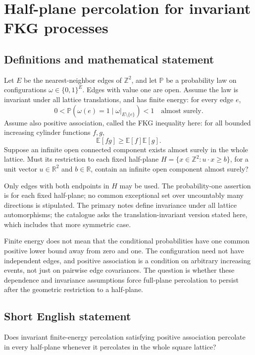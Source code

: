 \documentclass[11pt,a4paper]{article}
\begin{document}
\section*{Half-plane percolation for invariant FKG processes}\label{statement}

\subsection{Definitions and mathematical statement}
Let $E$ be the nearest-neighbor edges of $\mathbb Z^2$, and let $\mathbb P$ be a probability law on configurations $\omega\in\{0,1\}^E$. Edges with value one are open. Assume the law is invariant under all lattice translations, and has finite energy: for every edge $e$,
\[
0<\mathbb P(\omega(e)=1\mid\omega|_{E\setminus\{e\}})<1
\quad\text{almost surely}.
\]
Assume also positive association, called the FKG inequality here: for all bounded increasing cylinder functions $f,g$,
\[
\mathbb E[fg]\ge\mathbb E[f]\mathbb E[g].
\]
Suppose an infinite open connected component exists almost surely in the whole lattice. Must its restriction to each fixed half-plane $H=\{x\in\mathbb Z^2:u\cdot x\ge b\}$, for a unit vector $u\in\mathbb R^2$ and $b\in\mathbb R$, contain an infinite open component almost surely?

Only edges with both endpoints in $H$ may be used. The probability-one assertion is for each fixed half-plane; no common exceptional set over uncountably many directions is stipulated. The primary notes define invariance under all lattice automorphisms; the catalogue asks the translation-invariant version stated here, which includes that more symmetric case.

Finite energy does not mean that the conditional probabilities have one common positive lower bound away from zero and one. The configuration need not have independent edges, and positive association is a condition on arbitrary increasing events, not just on pairwise edge covariances. The question is whether these dependence and invariance assumptions force full-plane percolation to persist after the geometric restriction to a half-plane.
\subsection{Short English statement}
Does invariant finite-energy percolation satisfying positive association percolate in every half-plane whenever it percolates in the whole square lattice?
\end{document}
